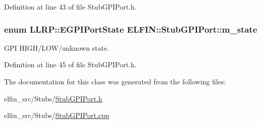 Definition at line 43 of file Stub\-G\-P\-I\-Port.\-h.

\hypertarget{class_e_l_f_i_n_1_1_stub_g_p_i_port_a6f9af5c95457b32dda056ddeb31978fc}{
\subsubsection[{m\-\_\-state}]{\setlength{\rightskip}{0pt plus 5cm}enum L\-L\-R\-P\-::\-E\-G\-P\-I\-Port\-State E\-L\-F\-I\-N\-::\-Stub\-G\-P\-I\-Port\-::m\-\_\-state\hspace{0.3cm}{\ttfamily [private]}}}\label{class_e_l_f_i_n_1_1_stub_g_p_i_port_a6f9af5c95457b32dda056ddeb31978fc}


G\-P\-I H\-I\-G\-H/\-L\-O\-W/unknown state. 



Definition at line 45 of file Stub\-G\-P\-I\-Port.\-h.



The documentation for this class was generated from the following files\-:\begin{DoxyCompactItemize}
\item 
elfin\-\_\-src/\-Stubs/\hyperlink{_stub_g_p_i_port_8h}{Stub\-G\-P\-I\-Port.\-h}\item 
elfin\-\_\-src/\-Stubs/\hyperlink{_stub_g_p_i_port_8cpp}{Stub\-G\-P\-I\-Port.\-cpp}\end{DoxyCompactItemize}
